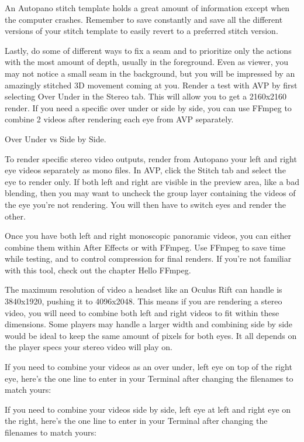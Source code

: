 \begin{fullwidth}
An Autopano stitch template holds a great amount of information except when the computer crashes.  Remember to save constantly and save all the different versions of your stitch template to easily revert to a preferred stitch version. 


Lastly, do some \textbf{} of different ways to fix a seam and to prioritize only the actions with the most amount of depth, usually in the foreground. Even as viewer, you may not notice a small seam in the background, but you will be impressed by an amazingly stitched 3D movement coming at you. Render a test with AVP by first selecting Over Under in the Stereo tab. This will allow you to get a 2160x2160 render. If you need a specific over under or side by side, you can use FFmpeg to combine 2 videos after rendering each eye from AVP separately.

\clearpage
{\large Over Under vs Side by Side. \par}

To render specific stereo video outputs, render from Autopano your left and right eye videos separately as mono files. In AVP, click the Stitch tab and select the eye to render only. If both left and right are visible in the preview area, like a bad blending, then you may want to uncheck the group layer containing the videos of the eye you’re not rendering. You will then have to switch eyes and render the other.

Once you have both left and right monoscopic panoramic videos, you can either combine them within After Effects or with FFmpeg. Use FFmpeg to save time while testing, and to control compression for final renders. If you’re not familiar with this tool, check out the chapter Hello FFmpeg. 

The maximum resolution of video a headset like an Oculus Rift can handle is 3840x1920, pushing it to 4096x2048. This means if you are rendering a stereo video, you will need to combine both left and right videos to fit within these dimensions. Some players may handle a larger width and combining side by side would be ideal to keep the same amount of pixels for both eyes. It all depends on the player specs your stereo video will play on. 

If you need to combine your videos as an over under, left eye on top of the right eye, here’s the one line to enter in your Terminal after changing the filenames to match yours:


If you need to combine your videos side by side, left eye at left and right eye on the right, here’s the one line to enter in your Terminal after changing the filenames to match yours:




\clearpage
\end{fullwidth}

